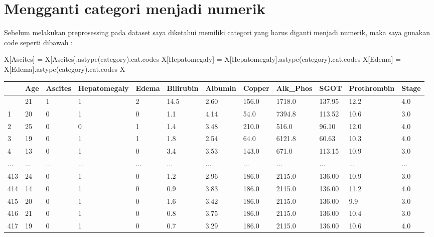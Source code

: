 \documentclass[
  letterpaper,
]{krantz}
\makeatletter
\newenvironment{Shaded}{\begin{snugshade}}{\end{snugshade}}
\newcommand{\NormalTok}[1]{\textcolor[rgb]{0.00,0.23,0.31}{#1}}
\newcommand{\OperatorTok}[1]{\textcolor[rgb]{0.37,0.37,0.37}{#1}}
\newcommand{\StringTok}[1]{\textcolor[rgb]{0.13,0.47,0.30}{#1}}
\newenvironment{kframe}{%
\medskip{}
\setlength{\fboxsep}{.8em}
 \def\at@end@of@kframe{}%
 \ifinner\ifhmode%
  \def\at@end@of@kframe{\end{minipage}}%
  \begin{minipage}{\columnwidth}%
 \fi\fi%
 \def\FrameCommand##1{\hskip\@totalleftmargin \hskip-\fboxsep
 \colorbox{shadecolor}{##1}\hskip-\fboxsep
     \hskip-\linewidth \hskip-\@totalleftmargin \hskip\columnwidth}%
 \MakeFramed {\advance\hsize-\width
   \@totalleftmargin\z@ \linewidth\hsize
   \@setminipage}}%
 {\par\unskip\endMakeFramed%
 \at@end@of@kframe}
\renewenvironment{Shaded}{\begin{kframe}}{\end{kframe}}
\makeatother
\begin{document}
\hypertarget{mengganti-categori-menjadi-numerik-1}{%
\section{Mengganti categori menjadi
numerik}\label{mengganti-categori-menjadi-numerik-1}}

Sebelum melakukan preprosessing pada dataset saya diketahui memiliki
categori yang harus diganti menjadi numerik, maka saya gunakan code
seperti dibawah :

\begin{Shaded}
\begin{Highlighting}[]

\NormalTok{X[}\StringTok{\textquotesingle{}Ascites\textquotesingle{}}\NormalTok{] }\OperatorTok{=}\NormalTok{ X[}\StringTok{\textquotesingle{}Ascites\textquotesingle{}}\NormalTok{].astype(}\StringTok{\textquotesingle{}category\textquotesingle{}}\NormalTok{).cat.codes}
\NormalTok{X[}\StringTok{\textquotesingle{}Hepatomegaly\textquotesingle{}}\NormalTok{] }\OperatorTok{=}\NormalTok{ X[}\StringTok{\textquotesingle{}Hepatomegaly\textquotesingle{}}\NormalTok{].astype(}\StringTok{\textquotesingle{}category\textquotesingle{}}\NormalTok{).cat.codes}
\NormalTok{X[}\StringTok{\textquotesingle{}Edema\textquotesingle{}}\NormalTok{] }\OperatorTok{=}\NormalTok{ X[}\StringTok{\textquotesingle{}Edema\textquotesingle{}}\NormalTok{].astype(}\StringTok{\textquotesingle{}category\textquotesingle{}}\NormalTok{).cat.codes}
\NormalTok{X}
\end{Highlighting}
\end{Shaded}

\begin{longtable}[]{@{}llllllllllll@{}}
\toprule\noalign{}
& Age & Ascites & Hepatomegaly & Edema & Bilirubin & Albumin & Copper &
Alk\_Phos & SGOT & Prothrombin & Stage \\
\midrule\noalign{}
\endhead
\bottomrule\noalign{}
\endlastfoot
0 & 21 & 1 & 1 & 2 & 14.5 & 2.60 & 156.0 & 1718.0 & 137.95 & 12.2 &
4.0 \\
1 & 20 & 0 & 1 & 0 & 1.1 & 4.14 & 54.0 & 7394.8 & 113.52 & 10.6 & 3.0 \\
2 & 25 & 0 & 0 & 1 & 1.4 & 3.48 & 210.0 & 516.0 & 96.10 & 12.0 & 4.0 \\
3 & 19 & 0 & 1 & 1 & 1.8 & 2.54 & 64.0 & 6121.8 & 60.63 & 10.3 & 4.0 \\
4 & 13 & 0 & 1 & 0 & 3.4 & 3.53 & 143.0 & 671.0 & 113.15 & 10.9 & 3.0 \\
... & ... & ... & ... & ... & ... & ... & ... & ... & ... & ... & ... \\
413 & 24 & 0 & 1 & 0 & 1.2 & 2.96 & 186.0 & 2115.0 & 136.00 & 10.9 &
3.0 \\
414 & 14 & 0 & 1 & 0 & 0.9 & 3.83 & 186.0 & 2115.0 & 136.00 & 11.2 &
4.0 \\
415 & 20 & 0 & 1 & 0 & 1.6 & 3.42 & 186.0 & 2115.0 & 136.00 & 9.9 &
3.0 \\
416 & 21 & 0 & 1 & 0 & 0.8 & 3.75 & 186.0 & 2115.0 & 136.00 & 10.4 &
3.0 \\
417 & 19 & 0 & 1 & 0 & 0.7 & 3.29 & 186.0 & 2115.0 & 136.00 & 10.6 &
4.0 \\
\end{longtable}
\end{document}
